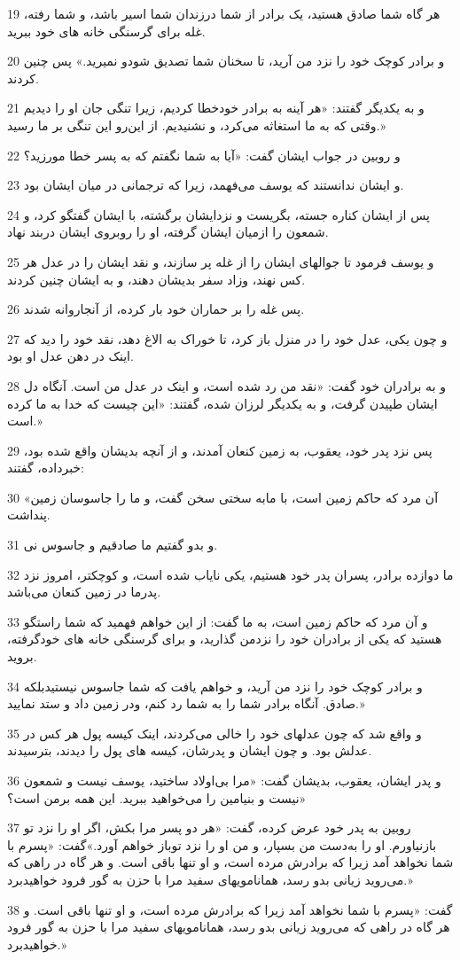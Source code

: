 \par 19 هر گاه شما صادق هستید، یک برادر از شما درزندان شما اسیر باشد، و شما رفته، غله برای گرسنگی خانه های خود ببرید.
\par 20 و برادر کوچک خود را نزد من آرید، تا سخنان شما تصدیق شودو نمیرید.» پس چنین کردند.
\par 21 و به یکدیگر گفتند: «هر آینه به برادر خودخطا کردیم، زیرا تنگی جان او را دیدیم وقتی که به ما استغاثه می‌کرد، و نشنیدیم. از این‌رو این تنگی بر ما رسید.»
\par 22 و روبین در جواب ایشان گفت: «آیا به شما نگفتم که به پسر خطا مورزید؟
\par 23 و ایشان ندانستند که یوسف می‌فهمد، زیرا که ترجمانی در میان ایشان بود.
\par 24 پس از ایشان کناره جسته، بگریست و نزدایشان برگشته، با ایشان گفتگو کرد، و شمعون را ازمیان ایشان گرفته، او را روبروی ایشان دربند نهاد.
\par 25 و یوسف فرمود تا جوالهای ایشان را از غله پر سازند، و نقد ایشان را در عدل هر کس نهند، وزاد سفر بدیشان دهند، و به ایشان چنین کردند.
\par 26 پس غله را بر حماران خود بار کرده، از آنجاروانه شدند.
\par 27 و چون یکی، عدل خود را در منزل باز کرد، تا خوراک به الاغ دهد، نقد خود را دید که اینک در دهن عدل او بود.
\par 28 و به برادران خود گفت: «نقد من رد شده است، و اینک در عدل من است. آنگاه دل ایشان طپیدن گرفت، و به یکدیگر لرزان شده، گفتند: «این چیست که خدا به ما کرده است.»
\par 29 پس نزد پدر خود، یعقوب، به زمین کنعان آمدند، و از آنچه بدیشان واقع شده بود، خبرداده، گفتند:
\par 30 «آن مرد که حاکم زمین است، با مابه سختی سخن گفت، و ما را جاسوسان زمین پنداشت.
\par 31 و بدو گفتیم ما صادقیم و جاسوس نی.
\par 32 ما دوازده برادر، پسران پدر خود هستیم، یکی نایاب شده است، و کوچکتر، امروز نزد پدرما در زمین کنعان می‌باشد.
\par 33 و آن مرد که حاکم زمین است، به ما گفت: از این خواهم فهمید که شما راستگو هستید که یکی از برادران خود را نزدمن گذارید، و برای گرسنگی خانه های خودگرفته، بروید.
\par 34 و برادر کوچک خود را نزد من آرید، و خواهم یافت که شما جاسوس نیستیدبلکه صادق. آنگاه برادر شما را به شما رد کنم، ودر زمین داد و ستد نمایید.»
\par 35 و واقع شد که چون عدلهای خود را خالی می‌کردند، اینک کیسه پول هر کس در عدلش بود. و چون ایشان و پدرشان، کیسه های پول را دیدند، بترسیدند.
\par 36 و پدر ایشان، یعقوب، بدیشان گفت: «مرا بی‌اولاد ساختید، یوسف نیست و شمعون نیست و بنیامین را می‌خواهید ببرید. این همه برمن است؟»
\par 37 روبین به پدر خود عرض کرده، گفت: «هر دو پسر مرا بکش، اگر او را نزد تو بازنیاورم. او را به‌دست من بسپار، و من او را نزد توباز خواهم آورد.»گفت: «پسرم با شما نخواهد آمد زیرا که برادرش مرده است، و او تنها باقی است. و هر گاه در راهی که می‌روید زیانی بدو رسد، همانامویهای سفید مرا با حزن به گور فرود خواهیدبرد.»
\par 38 گفت: «پسرم با شما نخواهد آمد زیرا که برادرش مرده است، و او تنها باقی است. و هر گاه در راهی که می‌روید زیانی بدو رسد، همانامویهای سفید مرا با حزن به گور فرود خواهیدبرد.»
 
